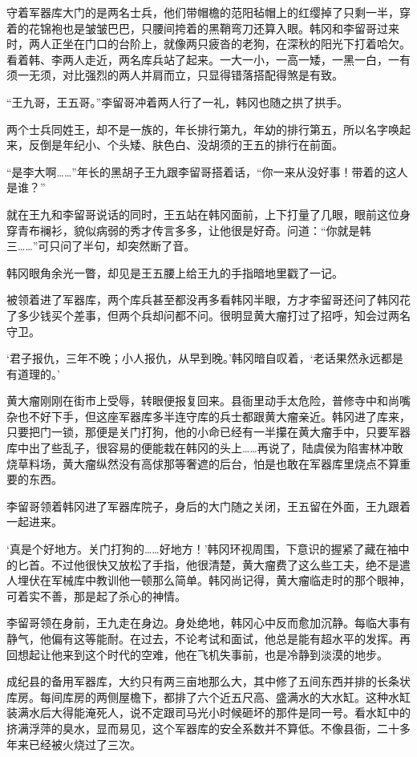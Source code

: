 守着军器库大门的是两名士兵，他们带帽檐的范阳毡帽上的红缨掉了只剩一半，穿着的花锦袍也是皱皱巴巴，只腰间挎着的黑鞘弯刀还算入眼。韩冈和李留哥过来时，两人正坐在门口的台阶上，就像两只疲沓的老狗，在深秋的阳光下打着哈欠。看着韩、李两人走近，两名库兵站了起来。一大一小，一高一矮，一黑一白，一有须一无须，对比强烈的两人并肩而立，只显得错落搭配得煞是有致。

“王九哥，王五哥。”李留哥冲着两人行了一礼，韩冈也随之拱了拱手。

两个士兵同姓王，却不是一族的，年长排行第九，年幼的排行第五，所以名字唤起来，反倒是年纪小、个头矮、肤色白、没胡须的王五的排行在前面。

“是李大啊……”年长的黑胡子王九跟李留哥搭着话，“你一来从没好事！带着的这人是谁？”

就在王九和李留哥说话的同时，王五站在韩冈面前，上下打量了几眼，眼前这位身穿青布襕衫，貌似病弱的秀才传言多多，让他很是好奇。问道：“你就是韩三……”可只问了半句，却突然断了音。

韩冈眼角余光一瞥，却见是王五腰上给王九的手指暗地里戳了一记。

被领着进了军器库，两个库兵甚至都没再多看韩冈半眼，方才李留哥还问了韩冈花了多少钱买个差事，但两个兵却问都不问。很明显黄大瘤打过了招呼，知会过两名守卫。

‘君子报仇，三年不晚；小人报仇，从早到晚。’韩冈暗自叹着，‘老话果然永远都是有道理的。’

黄大瘤刚刚在街市上受辱，转眼便报复回来。县衙里动手太危险，普修寺中和尚嘴杂也不好下手，但这座军器库多半连守库的兵士都跟黄大瘤亲近。韩冈进了库来，只要把门一锁，那便是关门打狗，他的小命已经有一半攥在黄大瘤手中，只要军器库中出了些乱子，很容易的便能栽在韩冈的头上……再说了，陆虞侯为陷害林冲敢烧草料场，黄大瘤纵然没有高俅那等奢遮的后台，怕是也敢在军器库里烧点不算重要的东西。

李留哥领着韩冈进了军器库院子，身后的大门随之关闭，王五留在外面，王九跟着一起进来。

‘真是个好地方。关门打狗的……好地方！’韩冈环视周围，下意识的握紧了藏在袖中的匕首。不过他很快又放松了手指，他很清楚，黄大瘤费了这么些工夫，绝不是遣人埋伏在军械库中教训他一顿那么简单。韩冈尚记得，黄大瘤临走时的那个眼神，可着实不善，那是起了杀心的神情。

李留哥领在身前，王九走在身边。身处绝地，韩冈心中反而愈加沉静。每临大事有静气，他偏有这等能耐。在过去，不论考试和面试，他总是能有超水平的发挥。再回想起让他来到这个时代的空难，他在飞机失事前，也是冷静到淡漠的地步。

成纪县的备用军器库，大约只有两三亩地那么大，其中修了五间东西并排的长条状库房。每间库房的两侧屋檐下，都排了六个近五尺高、盛满水的大水缸。这种水缸装满水后大得能淹死人，说不定跟司马光小时候砸坏的那件是同一号。看水缸中的挤满浮萍的臭水，显而易见，这个军器库的安全系数并不算低。不像县衙，二十多年来已经被火烧过了三次。

